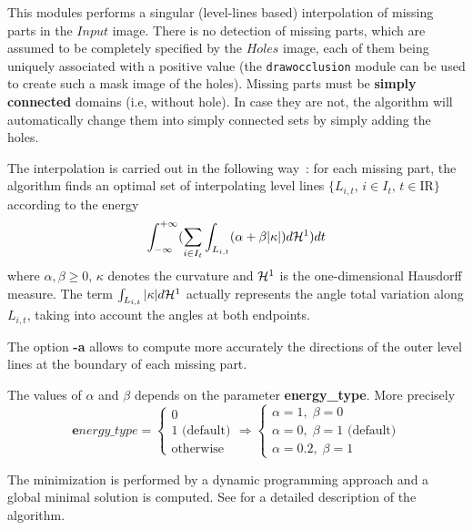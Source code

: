 This modules performs a singular (level-lines based) interpolation of missing parts in the $Input$ image. There is no detection of missing parts, which are assumed to be completely specified by the $Holes$ image, each of them being uniquely associated with a positive value (the \verb+drawocclusion+ module can
be used to create such a mask image of the holes). Missing parts must be {\bf simply connected} domains (i.e, without hole). In case they are not, the algorithm will automatically change them into simply connected sets by simply adding the holes.

\medskip
The interpolation is carried out in the following way~: for each missing part, the algorithm finds an optimal set of interpolating level lines $\{L_{i,t},\,i\in I_t,\,t\in {{\mathrm I}\!{\mathrm R}}\}$ according to the energy
$$\int_{-\infty}^{+\infty}(\sum_{i\in I_t}\int_{L_{i,t}}(\alpha+\beta|\kappa| )d{\cal H}^1)dt$$
where $\alpha,\beta\geq 0$, $\kappa$ denotes the curvature and ${\cal H}^1$ is the one-dimensional Hausdorff measure. The term $\int_{L_{i,t}}|\kappa|d{\cal H}^1$ actually represents the angle total variation along $L_{i,t}$, taking into account the angles at both endpoints. 

The option {\bf -a} allows to compute more accurately the directions of the outer level lines at the boundary of each missing part. 

The values of $\alpha$ and $\beta$ depends on the parameter {\bf energy\_type}. More precisely
$${\mathbf energy\_type}=\left\{\begin{array}{lll}
0\\
1\mbox{ (default)}\\
\mbox{otherwise}\end{array}\right.\Rightarrow\left\{\begin{array}{lll}
\alpha=1,\;\beta=0\\
\alpha=0,\;\beta=1\mbox{ (default)}\\
\alpha=0.2,\;\beta=1\end{array}\right.$$

The minimization is performed by a dynamic programming approach and a 
global minimal solution is computed. See \cite{masnou:disocclusion} for 
a detailed description of the algorithm.

